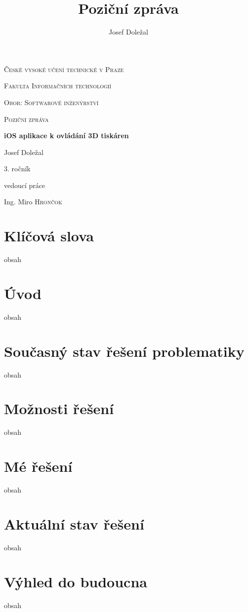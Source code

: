 \documentclass[czech]{article}
\begin{document}
\title{Poziční zpráva}
\author{Josef Doležal}

\begin{titlepage}
	\centering
	{\scshape\LARGE České vysoké učení technické v Praze \par}
	{\scshape\Large Fakulta Informačních technologií \par}
	{\scshape\Large Obor: Softwarové inženýrství \par}
	\vspace{1cm}
	{\scshape\Large Poziční zpráva\par}
	\vspace{1.5cm}
	{\huge\bfseries iOS aplikace k ovládání 3D tiskáren\par}
	\vspace{2cm}
	{\Large Josef Doležal\par}
	{\normalsize 3. ročník\par}
	\vfill
	vedoucí práce\par
	Ing. Miro \textsc{Hrončok}

	\vfill
\end{titlepage}

\newpage

\section{Klíčová slova}

obsah


\section{Úvod}

obsah

\section{Současný stav řešení problematiky}

obsah

\section{Možnosti řešení}

obsah

\section{Mé řešení}

obsah

\section{Aktuální stav řešení}

obsah

\section{Výhled do budoucna}

obsah

\newpage
\end{document}
